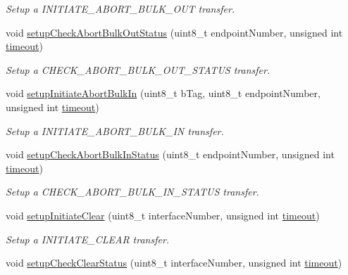 \begin{DoxyCompactItemize}
\begin{DoxyCompactList}\small\item\em Setup a I\-N\-I\-T\-I\-A\-T\-E\-\_\-\-A\-B\-O\-R\-T\-\_\-\-B\-U\-L\-K\-\_\-\-O\-U\-T transfer. \end{DoxyCompactList}\item 
void \hyperlink{classmdt_usbtmc_control_transfer_abc9b101aa6d0399a080f2d0eaf797f17}{setup\-Check\-Abort\-Bulk\-Out\-Status} (uint8\-\_\-t endpoint\-Number, unsigned int \hyperlink{classmdt_usb_transfer_a3262511f6062348132e7ee689c24226c}{timeout})
\begin{DoxyCompactList}\small\item\em Setup a C\-H\-E\-C\-K\-\_\-\-A\-B\-O\-R\-T\-\_\-\-B\-U\-L\-K\-\_\-\-O\-U\-T\-\_\-\-S\-T\-A\-T\-U\-S transfer. \end{DoxyCompactList}\item 
void \hyperlink{classmdt_usbtmc_control_transfer_a773bc4ac1644db83c771a3ede559821b}{setup\-Initiate\-Abort\-Bulk\-In} (uint8\-\_\-t b\-Tag, uint8\-\_\-t endpoint\-Number, unsigned int \hyperlink{classmdt_usb_transfer_a3262511f6062348132e7ee689c24226c}{timeout})
\begin{DoxyCompactList}\small\item\em Setup a I\-N\-I\-T\-I\-A\-T\-E\-\_\-\-A\-B\-O\-R\-T\-\_\-\-B\-U\-L\-K\-\_\-\-I\-N transfer. \end{DoxyCompactList}\item 
void \hyperlink{classmdt_usbtmc_control_transfer_a92cdb77ae78f7450304860d8c75bd140}{setup\-Check\-Abort\-Bulk\-In\-Status} (uint8\-\_\-t endpoint\-Number, unsigned int \hyperlink{classmdt_usb_transfer_a3262511f6062348132e7ee689c24226c}{timeout})
\begin{DoxyCompactList}\small\item\em Setup a C\-H\-E\-C\-K\-\_\-\-A\-B\-O\-R\-T\-\_\-\-B\-U\-L\-K\-\_\-\-I\-N\-\_\-\-S\-T\-A\-T\-U\-S transfer. \end{DoxyCompactList}\item 
void \hyperlink{classmdt_usbtmc_control_transfer_a557b7e2f922e942c8a029f70058fd509}{setup\-Initiate\-Clear} (uint8\-\_\-t interface\-Number, unsigned int \hyperlink{classmdt_usb_transfer_a3262511f6062348132e7ee689c24226c}{timeout})
\begin{DoxyCompactList}\small\item\em Setup a I\-N\-I\-T\-I\-A\-T\-E\-\_\-\-C\-L\-E\-A\-R transfer. \end{DoxyCompactList}\item 
void \hyperlink{classmdt_usbtmc_control_transfer_a7150005140f8efa6136ba81e4cb1c41a}{setup\-Check\-Clear\-Status} (uint8\-\_\-t interface\-Number, unsigned int \hyperlink{classmdt_usb_transfer_a3262511f6062348132e7ee689c24226c}{timeout})

\end{DoxyCompactItemize}
